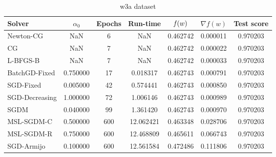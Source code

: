 \begin{table}
\centering
\caption{w3a dataset}
\label{tab:w3a-tab}
\begin{tabular}{lS[round-precision=3]S[drop-zero-decimal]S[round-precision=4]S[round-precision=6]S[exponent-mode=scientific]S[round-precision=6]}
\toprule
Solver & {$\alpha_0$} & {Epochs} & {Run-time} & {$\operatorname*{\mathit{f}}(w)$} & {$\nabla f(w)$} & {Test score} \\
\midrule
Newton-CG & NaN & 6 & NaN & 0.462742 & 0.000011 & 0.970203 \\
CG & NaN & 7 & NaN & 0.462742 & 0.000022 & 0.970203 \\
L-BFGS-B & NaN & 7 & NaN & 0.462742 & 0.000033 & 0.970203 \\
BatchGD-Fixed & 0.750000 & 17 & 0.018317 & 0.462743 & 0.000791 & 0.970203 \\
SGD-Fixed & 0.005000 & 42 & 0.574441 & 0.462743 & 0.000850 & 0.970203 \\
SGD-Decreasing & 1.000000 & 72 & 1.006146 & 0.462743 & 0.000989 & 0.970203 \\
SGDM & 0.040000 & 99 & 1.361420 & 0.462743 & 0.000970 & 0.970203 \\
MSL-SGDM-C & 0.500000 & 600 & 12.062421 & 0.463348 & 0.028706 & 0.970203 \\
MSL-SGDM-R & 0.750000 & 600 & 12.468809 & 0.465611 & 0.066743 & 0.970203 \\
SGD-Armijo & 0.100000 & 600 & 12.561584 & 0.472486 & 0.111806 & 0.970203 \\
\bottomrule
\end{tabular}
\end{table}

